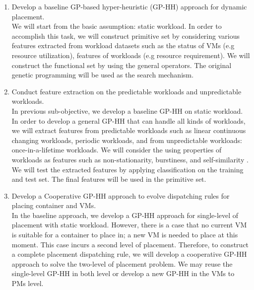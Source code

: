 \begin{enumerate}

	\item Develop a baseline GP-based hyper-heuristic (GP-HH) approach for dynamic placement. \\
	 We will start from the basic assumption: static workload. In order to accomplish this task, we will construct primitive set by considering various features extracted from workload datasets such as the status of VMs (e.g resource utilization), features of workloads (e.g resource requirement). We will construct the functional set by using the general operators. The original genetic programming will be used as the search mechanism.

	\item Conduct feature extraction on the predictable workloads and unpredictable workloads. \\
	 In previous sub-objective, we develop a baseline GP-HH on static workload. In order to develop a general GP-HH that can handle all kinds of workloads, we will extract features from predictable workloads such as linear continuous changing workloads, periodic workloads, and from unpredictable workloads: once-in-a-lifetime workloads. We will consider the using properties of workloads as features such as non-stationarity, burstiness, and self-similarity \cite{Feitelson:2002kn}. We will test the extracted features by applying classification on the training and test set. The final features will be used in the primitive set.



	\item Develop a Cooperative GP-HH approach to evolve dispatching rules for placing container and VMs. \\
	 In the baseline approach, we develop a GP-HH approach for single-level of placement with static workload. However, there is a case that no current VM is suitable for a container to place in; a new VM is needed to place at this moment. This case incurs a second level of placement. Therefore, to construct a complete placement dispatching rule, we will develop a cooperative GP-HH approach to solve the two-level of placement problem. We may reuse the single-level GP-HH in both level or develop a new GP-HH in the VMs to PMs level.  


\end{enumerate}
